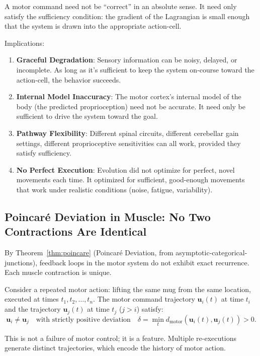 \begin{principle}
\label{prin:sufficiency-motor}
A motor command need not be ``correct'' in an absolute sense. It need only satisfy the sufficiency condition: the gradient of the Lagrangian is small enough that the system is drawn into the appropriate action-cell.

Implications:
\begin{enumerate}[label=(\arabic*), noitemsep]
\item \textbf{Graceful Degradation}: Sensory information can be noisy, delayed, or incomplete. As long as it's sufficient to keep the system on-course toward the action-cell, the behavior succeeds.
\item \textbf{Internal Model Inaccuracy}: The motor cortex's internal model of the body (the predicted proprioception) need not be accurate. It need only be sufficient to drive the system toward the goal.
\item \textbf{Pathway Flexibility}: Different spinal circuits, different cerebellar gain settings, different proprioceptive sensitivities can all work, provided they satisfy sufficiency.
\item \textbf{No Perfect Execution}: Evolution did not optimize for perfect, novel movements each time. It optimized for sufficient, good-enough movements that work under realistic conditions (noise, fatigue, variability).
\end{enumerate}
\end{principle}

\subsection{Poincaré Deviation in Muscle: No Two Contractions Are Identical}
\label{subsec:poincare-muscle}

By Theorem~\ref{thm:poincare} (Poincaré Deviation, from asymptotic-categorical-junctions), feedback loops in the motor system do not exhibit exact recurrence. Each muscle contraction is unique.

\begin{theorem}
\label{thm:poincare-motor}
Consider a repeated motor action: lifting the same mug from the same location, executed at times $t_1, t_2, \ldots, t_n$. The motor command trajectory $\mathbf{u}_i(t)$ at time $t_i$ and the trajectory $\mathbf{u}_j(t)$ at time $t_j$ ($j > i$) satisfy:
\begin{equation}
  \mathbf{u}_i \neq \mathbf{u}_j \quad \text{with strictly positive deviation} \quad \delta = \min_t d_{\text{motor}}(\mathbf{u}_i(t), \mathbf{u}_j(t)) > 0.
\end{equation}

This is not a failure of motor control; it is a feature. Multiple re-executions generate distinct trajectories, which encode the history of motor action.
\end{theorem}

